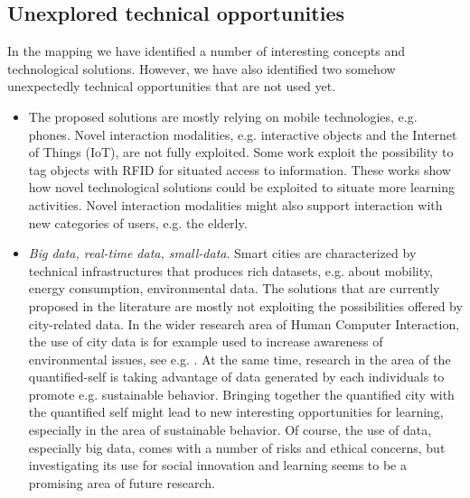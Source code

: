 \subsection*{Unexplored technical opportunities}
In the mapping we have identified a number of interesting concepts and technological solutions. However, we have also identified two somehow unexpectedly technical opportunities that are not used yet.
\begin{itemize}
\item The proposed solutions are mostly relying on mobile technologies, e.g. phones. Novel interaction modalities, e.g. interactive objects and the Internet of Things (IoT), are not fully exploited. Some work exploit the possibility to tag objects with RFID for situated access to information\cite{kashtan_outdoors_2013}. These works show how novel technological solutions could be exploited to situate more learning activities. Novel interaction modalities might also support interaction with new categories of users, e.g. the elderly.
\item \textit{Big data, real-time data, small-data}. Smart cities are characterized by technical infrastructures that produces rich datasets, e.g. about mobility, energy consumption, environmental data. The solutions that are currently proposed in the literature are mostly not exploiting the possibilities offered by city-related data. In the wider research area of Human Computer Interaction, the use of city data is for example used to increase awareness of environmental issues, see e.g. \cite{kashtan_outdoors_2013}. At the same time, research in the area of the quantified-self is taking advantage of data generated by each individuals to promote e.g. sustainable behavior. Bringing together the quantified city with the quantified self might lead to new interesting opportunities for learning, especially in the area of sustainable behavior. Of course, the use of data, especially big data, comes with a number of risks and ethical concerns, but investigating its use for social innovation and learning seems to be a promising area of future research.
\end{itemize}
